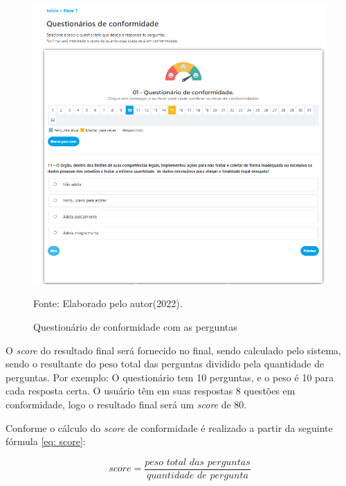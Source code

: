 \documentclass[
	12pt,				%
	openright,			%
	oneside,			%
	a4paper,			%
	english,			%
	french,				%
	spanish,			%
	brazil,				%
	]{abntex2}
\begin{document}
\begin{figure}[ht]
    \centering
    \caption{Questionário de conformidade com as perguntas}
    \includegraphics[width=6.2in]{Images/fase11.png}
    \label{fig: fase11}
    
    \centering \small Fonte: Elaborado pelo autor(2022).
\end{figure}

O \textit{score} do resultado final será fornecido no final, sendo calculado pelo sistema, sendo o resultante do peso total das perguntas dividido pela quantidade de perguntas. Por exemplo: O questionário tem 10 perguntas, e o peso é 10 para cada resposta certa. O usuário têm em suas respostas 8 questões em conformidade, logo o resultado final será um \textit{score} de 80.

Conforme o cálculo do \textit{score} de conformidade é realizado a partir da seguinte fórmula \ref{eq: score}: 

\begin{equation}
\label{eq: score}
    score = \frac {\textit{peso total das perguntas}} {\textit{quantidade de pergunta}}
\end{equation}

\pagebreak
\end{document}
